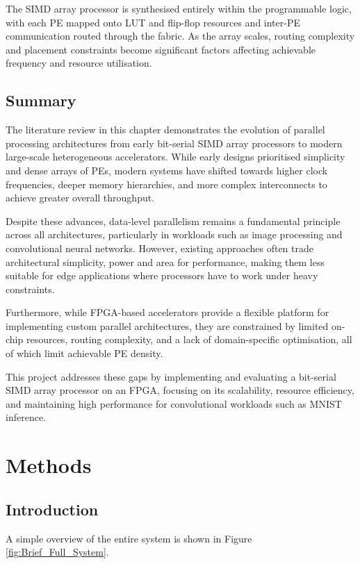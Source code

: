     The SIMD array processor is synthesised entirely within the programmable logic, with each PE mapped onto LUT and flip-flop resources and inter-PE communication routed through the fabric. As the array scales, routing complexity and placement constraints become significant factors affecting achievable frequency and resource utilisation.


        \subsection{Summary}
        
        The literature review in this chapter demonstrates the evolution of parallel processing architectures from early bit-serial SIMD array processors to modern large-scale heterogeneous accelerators. While early designs prioritised simplicity and dense arrays of PEs, modern systems have shifted towards higher clock frequencies, deeper memory hierarchies, and more complex interconnects to achieve greater overall throughput.
        
        Despite these advances, data-level parallelism remains a fundamental principle across all architectures, particularly in workloads such as image processing and convolutional neural networks. However, existing approaches often trade architectural simplicity, power and area for performance, making them less suitable for edge applications where processors have to work under heavy constraints.
        
        Furthermore, while FPGA-based accelerators provide a flexible platform for implementing custom parallel architectures, they are constrained by limited on-chip resources, routing complexity, and a lack of domain-specific optimisation, all of which limit achievable PE density.
        
        This project addresses these gaps by implementing and evaluating a bit-serial SIMD array processor on an FPGA, focusing on its scalability, resource efficiency, and maintaining high performance for convolutional workloads such as MNIST inference.

\section{Methods} \label{sec:methods}

  \subsection{Introduction}
    A simple overview of the entire system is shown in Figure \ref{fig:Brief_Full_System}.
    
